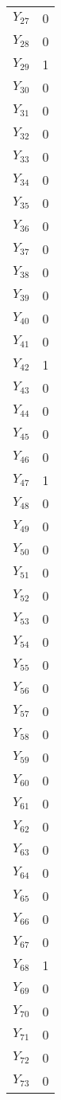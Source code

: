 \documentclass[a4paper,10pt]{article}
\begin{document}
\begin{center}
\begin{longtable}{cc}
$Y_{27}$ & 0 \\
$Y_{28}$ & 0 \\
$Y_{29}$ & 1 \\
$Y_{30}$ & 0 \\
$Y_{31}$ & 0 \\
$Y_{32}$ & 0 \\
$Y_{33}$ & 0 \\
$Y_{34}$ & 0 \\
$Y_{35}$ & 0 \\
$Y_{36}$ & 0 \\
$Y_{37}$ & 0 \\
$Y_{38}$ & 0 \\
$Y_{39}$ & 0 \\
$Y_{40}$ & 0 \\
$Y_{41}$ & 0 \\
$Y_{42}$ & 1 \\
$Y_{43}$ & 0 \\
$Y_{44}$ & 0 \\
$Y_{45}$ & 0 \\
$Y_{46}$ & 0 \\
$Y_{47}$ & 1 \\
$Y_{48}$ & 0 \\
$Y_{49}$ & 0 \\
$Y_{50}$ & 0 \\
$Y_{51}$ & 0 \\
$Y_{52}$ & 0 \\
$Y_{53}$ & 0 \\
$Y_{54}$ & 0 \\
$Y_{55}$ & 0 \\
$Y_{56}$ & 0 \\
$Y_{57}$ & 0 \\
$Y_{58}$ & 0 \\
$Y_{59}$ & 0 \\
$Y_{60}$ & 0 \\
$Y_{61}$ & 0 \\
$Y_{62}$ & 0 \\
$Y_{63}$ & 0 \\
$Y_{64}$ & 0 \\
$Y_{65}$ & 0 \\
$Y_{66}$ & 0 \\
$Y_{67}$ & 0 \\
$Y_{68}$ & 1 \\
$Y_{69}$ & 0 \\
$Y_{70}$ & 0 \\
$Y_{71}$ & 0 \\
$Y_{72}$ & 0 \\
$Y_{73}$ & 0 \\

\end{longtable}
\end{center}
\end{document}
